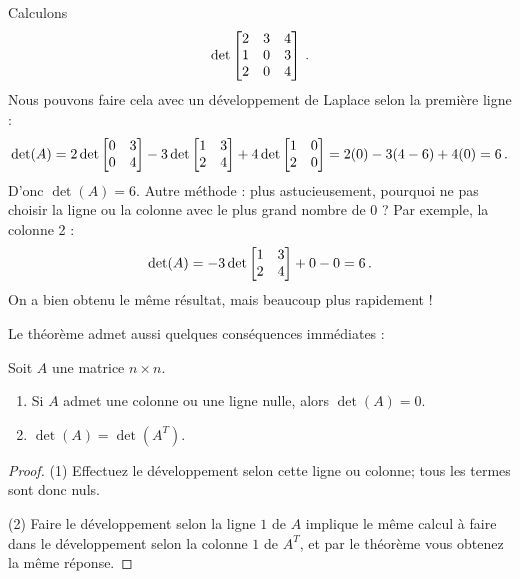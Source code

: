 

\begin{myexample} Calculons
$$\det\left[ \begin{matrix} 2 & 3 & 4\\ 1 & 0 & 3\\ 2 &0 & 4 \end{matrix} \right]\,.$$
Nous pouvons faire cela avec un développement de Laplace selon la première ligne :
$$
\det(A)=2\det\left[ \begin{matrix} 0&3\\0&4 \end{matrix} \right] - 3\det\left[ \begin{matrix} 1&3\\2&4 \end{matrix} \right]+4\det\left[ \begin{matrix} 1&0\\2&0 \end{matrix} \right]
= 2(0) - 3(4-6) +4(0) = 6\,.
$$
D'onc $\det(A) =6$. Autre méthode : plus astucieusement, pourquoi ne pas choisir la ligne ou la colonne avec le plus grand nombre de $0$ ?  Par exemple,
la colonne 2 :
$$
\det(A) = -3\det\left[ \begin{matrix} 1&3\\2&4 \end{matrix} \right] + 0 - 0 = 6\,.
$$
On a bien obtenu le même résultat, mais beaucoup plus rapidement !
\end{myexample}


Le théorème admet aussi quelques conséquences immédiates :

\begin{proposition}
Soit $A$ une matrice $n\times n$.
\begin{enumerate}
\item Si $A$ admet une colonne ou une ligne nulle, alors $\det(A) = 0$.
\item $\det(A) = \det(A^T)$.
\end{enumerate}
\end{proposition}

\begin{proof}
(1) Effectuez le développement selon cette ligne ou colonne; tous les termes sont donc nuls.

(2) Faire le développement selon la ligne $1$ de $A$ implique le même calcul \`a faire dans le développement selon la colonne $1$ de $A^T$, et par le théorème vous obtenez la même réponse. 
\end{proof}


